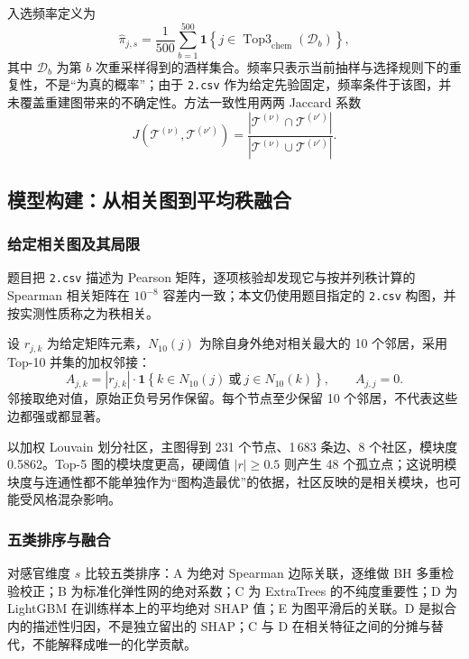 \documentclass[UTF8,a4paper,zihao=-4]{ctexart}
\numberwithin{figure}{section}
\numberwithin{table}{section}
\numberwithin{equation}{section}
\newcommand{\file}[1]{\texttt{#1}}
\begin{document}
入选频率定义为
\begin{equation}
\hat\pi_{j,s}=\frac{1}{500}\sum_{b=1}^{500}\mathbf{1}\left\{j\in\operatorname{Top3}_{\mathrm{chem}}(\mathcal{D}_b)\right\},
\label{eq:freq}
\end{equation}
其中 $\mathcal{D}_b$ 为第 $b$ 次重采样得到的酒样集合。频率只表示当前抽样与选择规则下的重复性，不是“为真的概率”；由于 \file{2.csv} 作为给定先验固定，频率条件于该图，并未覆盖重建图带来的不确定性。方法一致性用两两 Jaccard 系数
\begin{equation}
J\left(\mathcal{T}^{(\nu)},\mathcal{T}^{(\nu')}\right)=\frac{\left|\mathcal{T}^{(\nu)}\cap\mathcal{T}^{(\nu')}\right|}{\left|\mathcal{T}^{(\nu)}\cup\mathcal{T}^{(\nu')}\right|}.
\label{eq:jaccard}
\end{equation}

\subsection{模型构建：从相关图到平均秩融合}

\subsubsection{给定相关图及其局限}

题目把 \file{2.csv} 描述为 Pearson 矩阵，逐项核验却发现它与按并列秩计算的 Spearman 相关矩阵在 $10^{-8}$ 容差内一致；本文仍使用题目指定的 \file{2.csv} 构图，并按实测性质称之为秩相关。

设 $r_{j,k}$ 为给定矩阵元素，$N_{10}(j)$ 为除自身外绝对相关最大的 10 个邻居，采用 Top-10 并集的加权邻接：
\begin{equation}
A_{j,k}=\left|r_{j,k}\right|\cdot\mathbf{1}\left\{k\in N_{10}(j)\ \text{或}\ j\in N_{10}(k)\right\},\qquad A_{j,j}=0.
\label{eq:adj}
\end{equation}
邻接取绝对值，原始正负号另作保留。每个节点至少保留 10 个邻居，不代表这些边都强或都显著。

以加权 Louvain 划分社区\cite{langfelder2008}，主图得到 231 个节点、1\,683 条边、8 个社区，模块度 0.5862。Top-5 图的模块度更高，硬阈值 $|r|\ge0.5$ 则产生 48 个孤立点；这说明模块度与连通性都不能单独作为“图构造最优”的依据，社区反映的是相关模块，也可能受风格混杂影响。

\subsubsection{五类排序与融合}

对感官维度 $s$ 比较五类排序：A 为绝对 Spearman 边际关联，逐维做 BH 多重检验校正；B 为标准化弹性网的绝对系数；C 为 ExtraTrees 的不纯度重要性；D 为 LightGBM 在训练样本上的平均绝对 SHAP 值\cite{lundberg2017}；E 为图平滑后的关联。D 是拟合内的描述性归因，不是独立留出的 SHAP；C 与 D 在相关特征之间的分摊与替代，不能解释成唯一的化学贡献。
\end{document}

